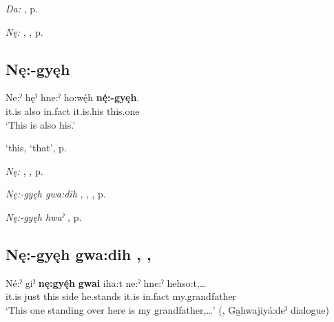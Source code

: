 \begin{CayugaRelated}
\item \textit{Da:} , p. \pageref{p:[da:]}\\
\item \textit{Nę:} , , p. \pageref{p:[nę:] ‘this, these’}
\end{CayugaRelated}

\subsection*{\textbf{Nę:-gyęh} } \label{p:[nę:-gyęh]}

\ea
\label{ex:npar109}
\gll Ne:ˀ hęˀ hne:ˀ ho:wę́h \textbf{nę́:-gyęh}. \\
it.is also in.fact it.is.his this.one\\
\glt ‘This is also his.’
\z

\begin{CayugaRelated}
\item {} `this, `that’, p. \pageref{p:[-gyęh]}\\
\item \textit{Nę:} , , p. \pageref{p:[nę:] ‘this, these’}\\
\item \textit{Nę:-gyęh gwa:dih} , , , p. \pageref{p:[nę:-gyęh gwa:dih]}\\
\item \textit{Nę:-gyęh hwaˀ} , p. \pageref{p:[nę:-gyęh hwaˀ] ‘this one’}
\end{CayugaRelated}


\subsection*{\textbf{Nę:-gyęh gwa:dih} , , } \label{p:[nę:-gyęh gwa:dih]}

\ea
\label{ex:npar110}
\gll Né:ˀ giˀ \textbf{nę:gyę́h} \textbf{gwai} iha:t ne:ˀ hne:ˀ hehso:t,… \\
it.is just this side he.stands it.is in.fact my.grandfather\\
\glt ‘This one standing over here is my grandfather,…’ (\cite[257]{mithun_watewayestanih_1984}, Ga̱hwajiyá:deˀ dialogue)
\z


